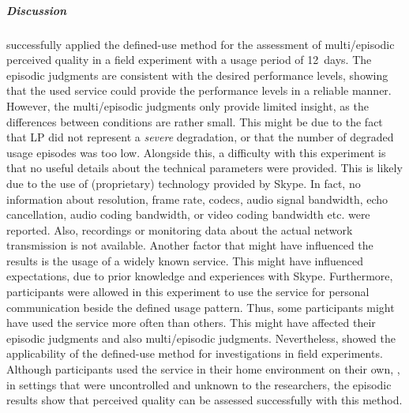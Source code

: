 \subparagraph{Discussion}
\citet{moller_single-call_2011} successfully applied the defined-use method for the assessment of multi\-/episodic perceived quality in a field experiment with a usage period of 12~days.
The episodic judgments are consistent with the desired performance levels, showing that the used service could provide the performance levels in a reliable manner.
However, the multi\-/episodic judgments only provide limited insight, as the differences between conditions are rather small.
This might be due to the fact that \ac{LP} did not represent a \emph{severe} degradation, or that the number of degraded usage episodes was too low.
Alongside this, a difficulty with this experiment is that no useful details about the technical parameters were provided.
This is likely due to the use of (proprietary) technology provided by Skype.
In fact, no information about resolution, frame rate, codecs, audio signal bandwidth, echo cancellation, audio coding bandwidth, or video coding bandwidth etc. were reported.
Also, recordings or monitoring data about the actual network transmission is not available.
Another factor that might have influenced the results is the usage of a widely known service.
This might have influenced expectations, due to prior knowledge and experiences with Skype.
Furthermore, participants were allowed in this experiment to use the service for personal communication beside the defined usage pattern.
Thus, some participants might have used the service more often than others.
This might have affected their episodic judgments and also multi\-/episodic judgments.
Nevertheless, \citet{moller_single-call_2011} showed the applicability of the defined-use method for investigations in field experiments.
Although participants used the service in their home environment on their own, \ie, in settings that were uncontrolled and unknown to the researchers, the episodic results show that perceived quality can be assessed successfully with this method.

